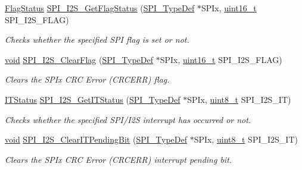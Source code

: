 \begin{DoxyCompactItemize}
\hyperlink{group___exported__types_ga89136caac2e14c55151f527ac02daaff}{Flag\-Status} \hyperlink{group___s_p_i___group5_ga1bd785d129e09c5734a876c8f2767204}{S\-P\-I\-\_\-\-I2\-S\-\_\-\-Get\-Flag\-Status} (\hyperlink{struct_s_p_i___type_def}{S\-P\-I\-\_\-\-Type\-Def} $\ast$S\-P\-Ix, \hyperlink{stdint_8h_a273cf69d639a59973b6019625df33e30}{uint16\-\_\-t} S\-P\-I\-\_\-\-I2\-S\-\_\-\-F\-L\-A\-G)
\begin{DoxyCompactList}\small\item\em Checks whether the specified S\-P\-I flag is set or not. \end{DoxyCompactList}\item 
\hyperlink{group___n_a_m_e_ga18028b8badbf1ea7e704ccac3c488e82}{void} \hyperlink{group___s_p_i___group5_ga3aabd9e2437e213056c0ed9bdfa1a724}{S\-P\-I\-\_\-\-I2\-S\-\_\-\-Clear\-Flag} (\hyperlink{struct_s_p_i___type_def}{S\-P\-I\-\_\-\-Type\-Def} $\ast$S\-P\-Ix, \hyperlink{stdint_8h_a273cf69d639a59973b6019625df33e30}{uint16\-\_\-t} S\-P\-I\-\_\-\-I2\-S\-\_\-\-F\-L\-A\-G)
\begin{DoxyCompactList}\small\item\em Clears the S\-P\-Ix C\-R\-C Error (C\-R\-C\-E\-R\-R) flag. \end{DoxyCompactList}\item 
\hyperlink{group___exported__types_gaacbd7ed539db0aacd973a0f6eca34074}{I\-T\-Status} \hyperlink{group___s_p_i___group5_ga72decbc1cd79f8fad92a2204beca6bc5}{S\-P\-I\-\_\-\-I2\-S\-\_\-\-Get\-I\-T\-Status} (\hyperlink{struct_s_p_i___type_def}{S\-P\-I\-\_\-\-Type\-Def} $\ast$S\-P\-Ix, \hyperlink{stdint_8h_aba7bc1797add20fe3efdf37ced1182c5}{uint8\-\_\-t} S\-P\-I\-\_\-\-I2\-S\-\_\-\-I\-T)
\begin{DoxyCompactList}\small\item\em Checks whether the specified S\-P\-I/\-I2\-S interrupt has occurred or not. \end{DoxyCompactList}\item 
\hyperlink{group___n_a_m_e_ga18028b8badbf1ea7e704ccac3c488e82}{void} \hyperlink{group___s_p_i___group5_ga35a524a49ff3d058137060f751e8749f}{S\-P\-I\-\_\-\-I2\-S\-\_\-\-Clear\-I\-T\-Pending\-Bit} (\hyperlink{struct_s_p_i___type_def}{S\-P\-I\-\_\-\-Type\-Def} $\ast$S\-P\-Ix, \hyperlink{stdint_8h_aba7bc1797add20fe3efdf37ced1182c5}{uint8\-\_\-t} S\-P\-I\-\_\-\-I2\-S\-\_\-\-I\-T)
\begin{DoxyCompactList}\small\item\em Clears the S\-P\-Ix C\-R\-C Error (C\-R\-C\-E\-R\-R) interrupt pending bit. \end{DoxyCompactList}\end{DoxyCompactItemize}


